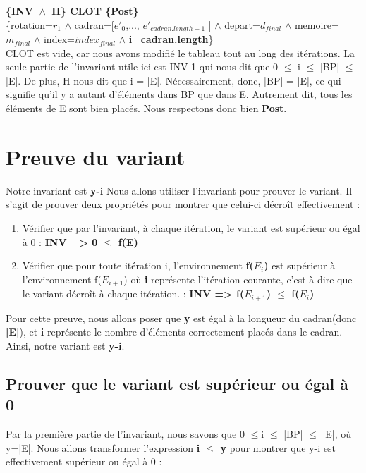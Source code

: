 \documentclass[a4paper, 12pt]{article}
\begin{document}
\textbf{\{INV $\dot{\wedge}$ H\} CLOT \{Post\}}\\

\{rotation=$r_{1}$ $\wedge$ cadran=[$e'_{0}$,..., $e'_{cadran.length-1}$ ] $\wedge$ depart=$d_{final}$ $\wedge$ memoire=$m_{final}$ $\wedge$ index=$index_{final}$ $\wedge$ \textbf{i=cadran.length}\}\\




CLOT est vide, car nous avons modifié le tableau tout au long des itérations.
La seule partie de l'invariant utile ici est INV 1 qui nous dit que 0 $\le$ i $\le$ |BP| $\le$ |E|. De plus, H nous dit que i = |E|. Nécessairement, donc, |BP| = |E|, ce qui signifie qu'il y a autant d'éléments dans BP que dans E. Autrement dit, tous les éléments de E sont bien placés.
Nous respectons donc bien \textbf{Post}.

\newpage
\section{Preuve du variant}
Notre invariant est \textbf{y-i}
Nous allons utiliser l'invariant pour prouver le variant. Il s'agit de prouver deux propriétés pour montrer que celui-ci décroît effectivement : 
\begin{enumerate}


\item Vérifier que par l'invariant, à chaque itération, le variant est supérieur ou égal à 0 : \textbf{INV => 0 $\le$ f(E) }
\item Vérifier que pour toute itération i, l'environnement \textbf{f($E_{i}$)} est supérieur à l'environnement f($E_{i+1}$) où \textbf{i} représente l'itération courante, c'est à dire que le variant décroît à chaque itération. : \textbf{ INV => f($E_{i+1}$) $\le$ f($E_{i}$)}
\end{enumerate}

Pour cette preuve, nous allons poser que \textbf{y} est égal à la longueur du cadran(donc \textbf{|E|}), et \textbf{i} représente le nombre d'éléments correctement placés dans le cadran.\\

Ainsi, notre variant est \textbf{y-i}.
\subsection{Prouver que le variant est supérieur ou égal à 0}
Par la première partie de l'invariant, nous savons que 0 $\le$i $\le$ |BP| $\le$ |E|, où y=|E|. Nous allons transformer l'expression \textbf{i $\le$ y} pour montrer que y-i est effectivement supérieur ou égal à 0 : \\
\end{document}
